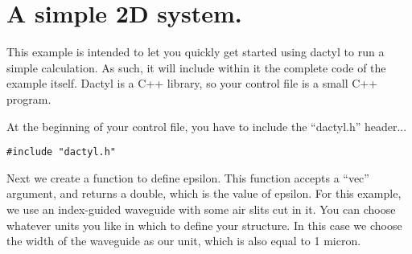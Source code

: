 \begin{comment}
/*
\end{comment}
\section{A simple 2D system.}
\begin{comment}
*/
\end{comment}

This example is intended to let you quickly get started using dactyl to run
a simple calculation.  As such, it will include within it the complete code
of the example itself.  Dactyl is a C++ library, so your control file is a
small C++ program.

At the beginning of your control file, you have to include the ``dactyl.h''
header...
\begin{verbatim}
#include "dactyl.h"
\end{verbatim}

Next we create a function to define epsilon.  This function accepts a
``vec'' argument, and returns a double, which is the value of epsilon.  For
this example, we use an index-guided waveguide with some air slits cut in
it.  You can choose whatever units you like in which to define your
structure.  In this case we choose the width of the waveguide as our unit,
which is also equal to 1 micron.

